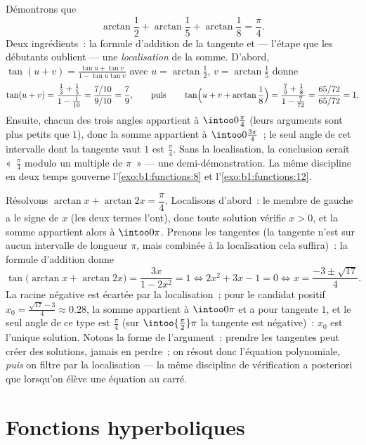 \begin{example}\label{ex:b1:functions:arctansum}
Démontrons que
\[
\arctan\frac12 + \arctan\frac15 + \arctan\frac18 = \frac\pi4 .
\]
Deux ingrédients~: la formule d'addition de la tangente et --- l'étape
que les débutants oublient --- une \emph{localisation} de la somme.
D'abord, $\tan(u + v) = \frac{\tan u + \tan v}{1 - \tan u\tan v}$ avec
$u = \arctan\frac12$, $v = \arctan\frac15$ donne
\[
\tan(u + v) = \frac{\frac12 + \frac15}{1 - \frac1{10}}
= \frac{7/10}{9/10} = \frac79,
\qquad\text{puis}\qquad
\tan\Bigl(u + v + \arctan\frac18\Bigr)
= \frac{\frac79 + \frac18}{1 - \frac7{72}}
= \frac{65/72}{65/72} = 1 .
\]
Ensuite, chacun des trois angles appartient à $\intoo0{\frac\pi4}$
(leurs arguments sont plus petits que $1$), donc la somme appartient à
$\intoo0{\frac{3\pi}4}$~; le seul angle de cet intervalle dont la
tangente vaut $1$ est $\frac\pi4$. Sans la localisation, la conclusion
serait «~$\frac\pi4$ modulo un multiple de $\pi$~» --- une
demi-démonstration. La même discipline en deux temps gouverne
l'\cref{exo:b1:functions:8} et l'\cref{exo:b1:functions:12}.
\end{example}

\begin{example}\label{ex:b1:functions:arctaneq}
Résolvons $\arctan x + \arctan 2x = \dfrac\pi4$. Localisons d'abord~:
le membre de gauche a le signe de $x$ (les deux termes l'ont), donc
toute solution vérifie $x > 0$, et la somme appartient alors à
$\intoo0\pi$. Prenons les tangentes (la tangente n'est  sur
aucun intervalle de longueur $\pi$, mais combinée à la localisation
cela suffira)~: la formule d'addition donne
\[
\tan\bigl(\arctan x + \arctan 2x\bigr)
= \frac{3x}{1 - 2x^2} = 1
\iff 2x^2 + 3x - 1 = 0
\iff x = \frac{-3 \pm \sqrt{17}}4 .
\]
La racine négative est écartée par la localisation~; pour le candidat
positif $x_0 = \frac{\sqrt{17} - 3}4 \approx 0.28$, la somme
appartient à $\intoo0\pi$ et a pour tangente $1$, et le seul angle de
ce type est $\frac\pi4$ (sur $\intoo{\frac\pi2}\pi$ la tangente est
négative)~: $x_0$ est l'unique solution. Notons la forme de
l'argument~: prendre les tangentes peut créer des solutions, jamais en
perdre~; on résout donc l'équation polynomiale, \emph{puis} on filtre
par la localisation --- la même discipline de vérification a
posteriori que lorsqu'on élève une équation au carré.
\end{example}

\section{Fonctions hyperboliques}

